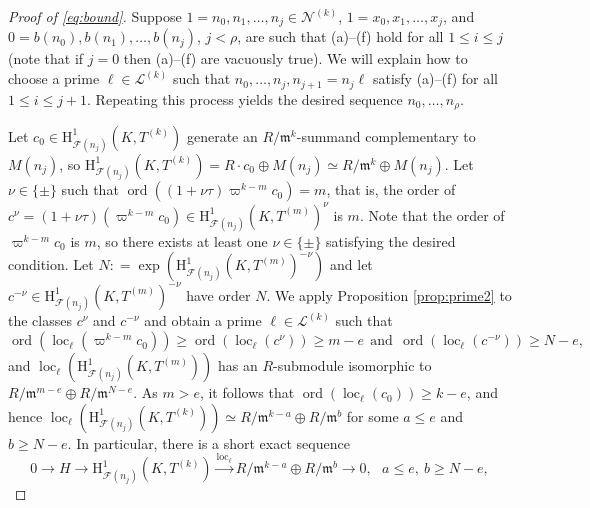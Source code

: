 \documentclass[a4paper,10pt]{amsart}
\numberwithin{equation}{section}
\numberwithin{equation}{section}
\theoremstyle{plain}
\theoremstyle{definition}
\theoremstyle{definition}
\theoremstyle{plain}
\theoremstyle{plain}
\theoremstyle{plain}
\theoremstyle{plain}
\DeclareMathOperator{\ord}{ord}
\newcommand{\F}{\mathcal{F}}
\DeclareMathOperator{\loc}{loc}
\newcommand{\Fcal}{\mathcal{F}}
\newcommand{\fm}{\mathfrak{m}}
\newcommand{\rH}{\mathrm{H}}
\begin{document}
\begin{proof}[Proof of \eqref{eq:bound}]
Suppose $1=n_0, n_1, \dots, n_j \in \mathscr{N}^{(k)}$, $1=x_0, x_1, \dots, x_j$, and $0=b(n_0), b(n_1), \dots, b(n_j)$, $j<\rho$, are such that (a)--(f) hold for all $1\leq i\leq j$ (note that if $j=0$ then (a)--(f) are vacuously true).  
We will explain how to choose a prime $\ell\in \mathscr{L}^{(k)}$ such that $n_0,\dots,n_j,n_{j+1}=n_j\ell$
satisfy (a)--(f) for all $1\leq i\leq j+1$. Repeating this process yields the desired sequence $n_0,\dots,n_\rho$.


Let $c_0\in \rH^1_{\F(n_j)}(K,T^{(k)})$ generate an $R/\fm^{k}$-summand complementary to $M(n_{j})$, so
$\rH^1_{\F(n_j)}(K,T^{(k)}) = R \cdot c_0 \oplus M(n_j) \simeq R/\fm^k\oplus M(n_j)$.
Let $\nu \in \{\pm \}$ such that $\ord((1+\nu\tau)\varpi^{k-m}c_0)=m$, that is, the order of
$c^{\nu}= (1+\nu\tau)(\varpi^{k-m}c_0) \in \rH^1_{\F(n_j)}(K,T^{(m)})^{\nu}$ is $m$. Note that the order of $\varpi^{k-m}c_0$ is $m$, so there exists at least one $\nu \in \{\pm \}$ satisfying the desired condition.
%
Let $N: = \operatorname{exp} ( \rH^1_{\Fcal(n_j)}(K,T^{(m)})^{-\nu})$ and 
let $c^{-\nu} \in \rH^1_{\Fcal(n_j)}(K,T^{(m)})^{-\nu}$ have order $N$. 
%
%
We apply Proposition \ref{prop:prime2} to the classes $c^{\nu}$ and  $c^{-\nu}$ and obtain a prime $\ell\in \mathscr{L}^{(k)}$ such that
\[
\ord(\loc_{\ell}(\varpi^{k-m}c_0))\geq  \ord(\loc_{\ell}(c^{\nu}))\geq m-e \ \ \text{and} \ \ \ord(\loc_{\ell}(c^{-\nu}))\geq N-e,
\]
and $\loc_{\ell}( \rH^1_{\Fcal(n_j)}(K,T^{(m)}))$ has an $R$-submodule isomorphic to $R/\fm^{m-e}\oplus R/\fm^{N-e}$.
%
As $m>e$, it follows that $\ord(\loc_{\ell}(c_0))\geq k-e$, and
hence $\loc_\ell(\rH^1_{\F(n_j)}(K,T^{(k)})) \simeq R/\fm^{k-a}\oplus R/\fm^{b}$ for some $a\leq e$ and $b\geq N-e$.
In particular, there is a short exact sequence
\begin{equation}\label{eq:imageloc}
0\to H \to \rH^1_{\Fcal(n_j)}(K,T^{(k)}) \xrightarrow{\loc_{\ell}} R/\fm^{k-a}\oplus R/\fm^{b}\to 0, \ \ \ a\leq e, \ b\geq N-e,

\end{equation}
\end{proof}
\end{document}
